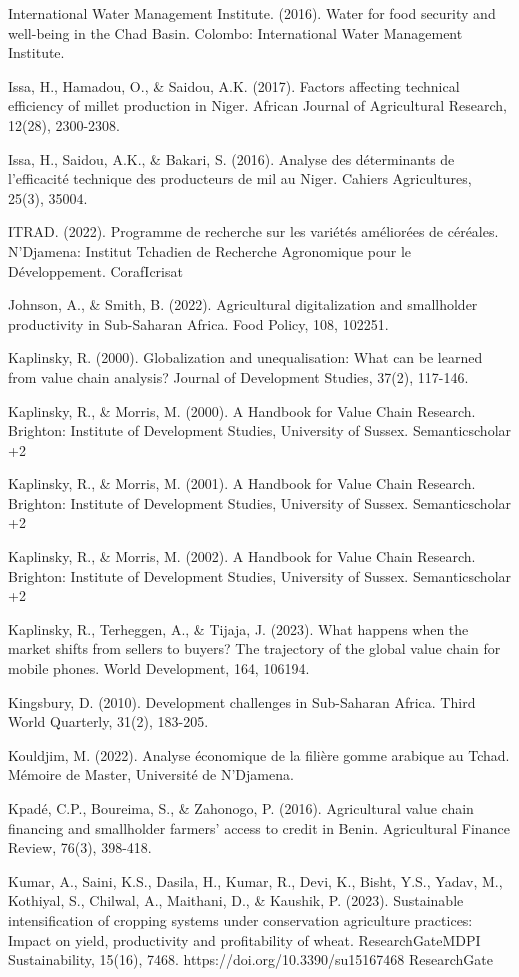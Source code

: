 \documentclass[12pt,oneside]{report}
\begin{document}
International Water Management Institute. (2016). Water for food security and well-being in the Chad Basin. Colombo: International Water Management Institute.

Issa, H., Hamadou, O., \& Saidou, A.K. (2017). Factors affecting technical efficiency of millet production in Niger. African Journal of Agricultural Research, 12(28), 2300-2308.

Issa, H., Saidou, A.K., \& Bakari, S. (2016). Analyse des déterminants de l'efficacité technique des producteurs de mil au Niger. Cahiers Agricultures, 25(3), 35004.

ITRAD. (2022). Programme de recherche sur les variétés améliorées de céréales. N'Djamena: Institut Tchadien de Recherche Agronomique pour le Développement. CorafIcrisat

Johnson, A., \& Smith, B. (2022). Agricultural digitalization and smallholder productivity in Sub-Saharan Africa. Food Policy, 108, 102251.

Kaplinsky, R. (2000). Globalization and unequalisation: What can be learned from value chain analysis? Journal of Development Studies, 37(2), 117-146.

Kaplinsky, R., \& Morris, M. (2000). A Handbook for Value Chain Research. Brighton: Institute of Development Studies, University of Sussex. Semanticscholar +2

Kaplinsky, R., \& Morris, M. (2001). A Handbook for Value Chain Research. Brighton: Institute of Development Studies, University of Sussex. Semanticscholar +2

Kaplinsky, R., \& Morris, M. (2002). A Handbook for Value Chain Research. Brighton: Institute of Development Studies, University of Sussex. Semanticscholar +2

Kaplinsky, R., Terheggen, A., \& Tijaja, J. (2023). What happens when the market shifts from sellers to buyers? The trajectory of the global value chain for mobile phones. World Development, 164, 106194.

Kingsbury, D. (2010). Development challenges in Sub-Saharan Africa. Third World Quarterly, 31(2), 183-205.

Kouldjim, M. (2022). Analyse économique de la filière gomme arabique au Tchad. Mémoire de Master, Université de N'Djamena.

Kpadé, C.P., Boureima, S., \& Zahonogo, P. (2016). Agricultural value chain financing and smallholder farmers' access to credit in Benin. Agricultural Finance Review, 76(3), 398-418.

Kumar, A., Saini, K.S., Dasila, H., Kumar, R., Devi, K., Bisht, Y.S., Yadav, M., Kothiyal, S., Chilwal, A., Maithani, D., \& Kaushik, P. (2023). Sustainable intensification of cropping systems under conservation agriculture practices: Impact on yield, productivity and profitability of wheat. ResearchGateMDPI Sustainability, 15(16), 7468. https://doi.org/10.3390/su15167468 ResearchGate
\end{document}
